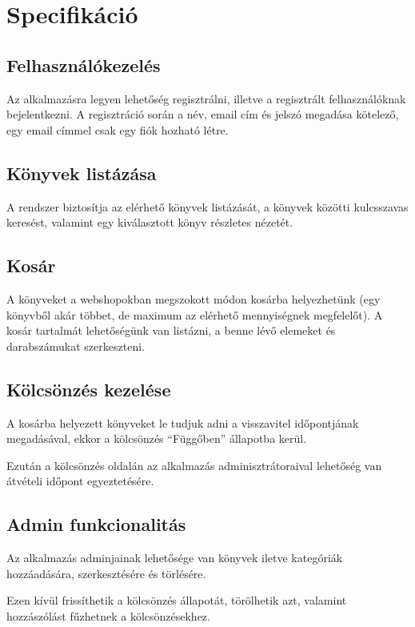\chapter{Specifikáció}

\section{Felhasználókezelés}

Az alkalmazásra legyen lehetőség regisztrálni, illetve a regisztrált felhasználóknak bejelentkezni.
A regisztráció során a név, email cím és jelszó megadása kötelező, egy email címmel csak egy fiók hozható létre.

\section{Könyvek listázása}

A rendszer biztosítja az elérhető könyvek listázását, a könyvek közötti kulcsszavas keresést, valamint
egy kiválasztott könyv részletes nézetét.

\section{Kosár}

A könyveket a webshopokban megszokott módon kosárba helyezhetünk (egy könyvből akár többet, de maximum az elérhető mennyiségnek megfelelőt).
A kosár tartalmát lehetőségünk van listázni, a benne lévő elemeket és darabszámukat szerkeszteni.

\section{Kölcsönzés kezelése}

A kosárba helyezett könyveket le tudjuk adni a visszavitel időpontjának megadásával, ekkor a kölcsönzés ``Függőben'' állapotba kerül.

Ezután a kölcsönzés oldalán az alkalmazás adminisztrátoraival lehetőség van átvételi időpont egyeztetésére.

\section{Admin funkcionalitás}

Az alkalmazás adminjainak lehetősége van könyvek iletve kategóriák hozzáadására, szerkesztésére és törlésére.

Ezen kívül frissíthetik a kölcsönzés állapotát, törölhetik azt, valamint hozzászólást fűzhetnek a kölcsönzésekhez.
